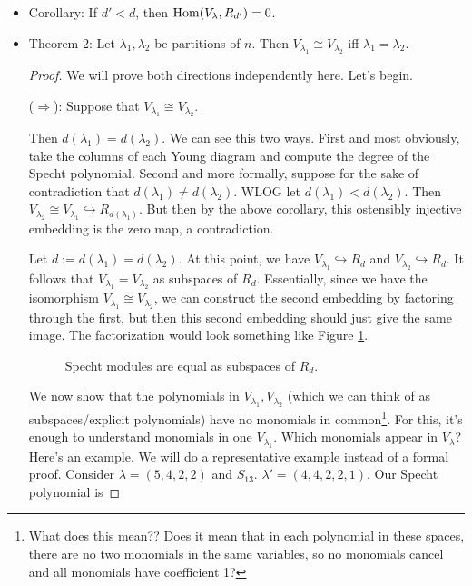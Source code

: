 \documentclass[../notes.tex]{subfiles}
\begin{document}
\begin{itemize}
\begin{proof}
        Therefore, since it is equal to an irrep, $V_\lambda$ is irreducible.
    \end{proof}
    \item Corollary: If $d'<d$, then $\operatorname{Hom}(V_\lambda,R_{d'})=0$.
    \item Theorem 2: Let $\lambda_1,\lambda_2$ be partitions of $n$. Then $V_{\lambda_1}\cong V_{\lambda_2}$ iff $\lambda_1=\lambda_2$.
    \begin{proof}
        We will prove both directions independently here. Let's begin.\par\smallskip
        ($\Rightarrow$): Suppose that $V_{\lambda_1}\cong V_{\lambda_2}$.\par
        Then $d(\lambda_1)=d(\lambda_2)$. We can see this two ways. First and most obviously, take the columns of each Young diagram and compute the degree of the Specht polynomial. Second and more formally, suppose for the sake of contradiction that $d(\lambda_1)\neq d(\lambda_2)$. WLOG let $d(\lambda_1)<d(\lambda_2)$. Then $V_{\lambda_2}\cong V_{\lambda_1}\hookrightarrow R_{d(\lambda_1)}$. But then by the above corollary, this ostensibly injective embedding is the zero map, a contradiction.\par
        Let $d:=d(\lambda_1)=d(\lambda_2)$. At this point, we have $V_{\lambda_1}\hookrightarrow R_d$ and $V_{\lambda_2}\hookrightarrow R_d$. It follows that $V_{\lambda_1}=V_{\lambda_2}$ as subspaces of $R_d$. Essentially, since we have the isomorphism $V_{\lambda_1}\cong V_{\lambda_2}$, we can construct the second embedding by factoring through the first, but then this second embedding should just give the same image. The factorization would look something like Figure \ref{fig:SpechtSubspace}.
        \begin{figure}[H]
            \centering
            \caption{Specht modules are equal as subspaces of $R_d$.}
            \label{fig:SpechtSubspace}
        \end{figure}
        We now show that the polynomials in $V_{\lambda_1},V_{\lambda_2}$ (which we can think of as subspaces/explicit polynomials) have no monomials in common\footnote{What does this mean?? Does it mean that in each polynomial in these spaces, there are no two monomials in the same variables, so no monomials cancel and all monomials have coefficient 1?}. For this, it's enough to understand monomials in one $V_{\lambda_1}$. Which monomials appear in $V_\lambda$? Here's an example. We will do a representative example instead of a formal proof. Consider $\lambda=(5,4,2,2)$ and $S_{13}$. $\lambda'=(4,4,2,2,1)$. Our Specht polynomial is

\end{proof}
\end{itemize}
\end{document}
